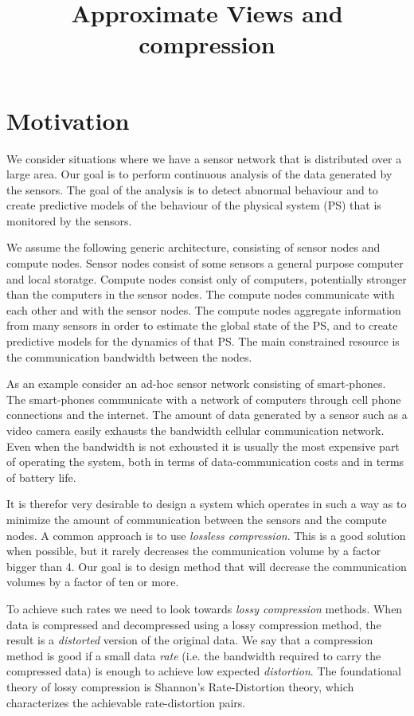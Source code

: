 \documentclass[11pt]{article}
\title{Approximate Views and compression}
\begin{document}
\maketitle

\section{Motivation}
We consider situations where we have a sensor network that is
distributed over a large area. Our goal is to perform continuous
analysis of the data generated by the sensors. The goal of the
analysis is to detect abnormal behaviour and to create predictive
models of the behaviour of the physical system (PS) that is monitored
by the sensors.

We assume the following generic architecture, consisting of sensor
nodes and compute nodes. Sensor nodes consist of some sensors a
general purpose computer and local storatge. Compute nodes consist
only of computers, potentially stronger than the computers in the
sensor nodes. The compute nodes communicate with each other and with
the sensor nodes. The compute nodes aggregate information from many
sensors in order to estimate the global state of the PS,
and to create predictive models for the dynamics of that PS.
The main constrained resource is the communication bandwidth between
the nodes.

As an example consider an ad-hoc sensor network consisting of
smart-phones. The smart-phones communicate with a network of computers
through cell phone connections and the internet.  The amount of data
generated by a sensor such as a video camera easily exhausts the
bandwidth cellular communication network. Even when the bandwidth is
not exhousted it is usually the most expensive part of operating the
system, both in terms of data-communication costs and in terms of
battery life.

It is therefor very desirable to design a system which operates in
such a way as to minimize the amount of communication between the
sensors and the compute nodes. A common approach is to use {\em
  lossless compression}. This is a good solution when possible, but it
rarely decreases the communication volume by a factor bigger than 4.
Our goal is to design method that will decrease the communication
volumes by a factor of ten or more.

To achieve such rates we need to look towards {\em lossy compression}
methods. When data is compressed and decompressed using a lossy
compression method, the result is a {\em distorted} version of the
original data. We say that a compression method is good if a small
data {\em rate} (i.e. the bandwidth required to carry the compressed
data) is enough to achieve low expected {\em distortion}. The
foundational theory of lossy compression is Shannon's Rate-Distortion
theory, which characterizes the achievable rate-distortion pairs.
\end{document}
